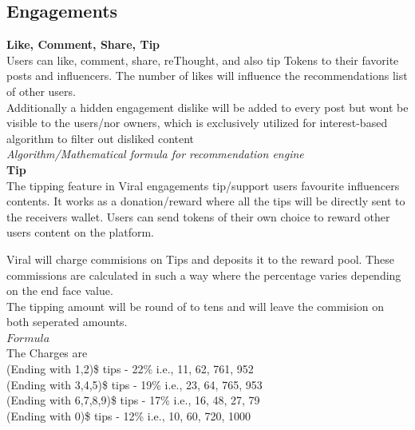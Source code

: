 \documentclass[10pt]{article}
\begin{document}
\subsection{Engagements}

\textbf{Like, Comment, Share, Tip}\\

Users can like, comment, share, reThought, and also tip Tokens to their favorite posts and influencers. The number of likes will influence the recommendations list of other users.\\

Additionally a hidden engagement dislike will be added to every post but won\textsc{}t be visible to the users/nor owners, which is exclusively utilized for interest-based algorithm to filter out disliked content\\

\textit{Algorithm/Mathematical formula for recommendation engine}\\

\textbf{Tip}\\

The tipping feature in Viral engagements tip/support user\textsc{}s favourite influencers\textsc{} contents. It works as a donation/reward where all the tips will be directly sent to the receivers wallet. Users can send tokens of their own choice to reward other users content on the platform.

Viral will charge commisions on Tips and deposits it to the reward pool. These commissions are calculated in such a way where the percentage varies depending on the end face value.\\

The tipping amount will be round of to tens and will leave the commision on both seperated amounts.\\

$Formula$\\

The Charges are\\


(Ending with 1,2)\$ tips     - 22\%      i.e., 11, 62, 761, 952\\
(Ending with 3,4,5)\$ tips   - 19\%      i.e., 23, 64, 765, 953\\
(Ending with 6,7,8,9)\$ tips - 17\%      i.e., 16, 48, 27,  79\\
(Ending with 0)\$ tips       - 12\%      i.e., 10, 60, 720, 1000\\
\end{document}
